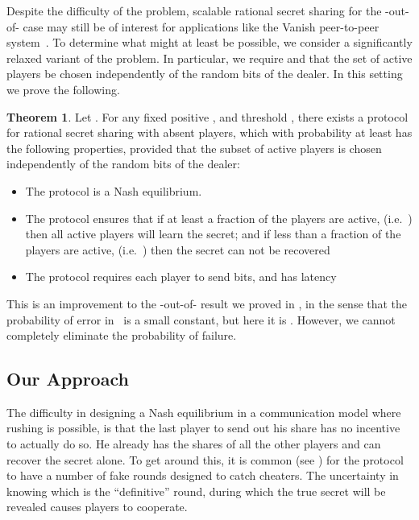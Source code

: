 \documentclass[12pt]{article}
\theoremstyle{definition}
\newtheorem{theorem}{Theorem}
\begin{document}
Despite the difficulty of the problem, scalable rational secret
sharing for the -out-of- case may still be of interest for
applications like the Vanish peer-to-peer
system~\cite{geambasu2009vanish}.  To determine what might at least be
possible, we consider a significantly relaxed variant of the problem.
In particular, we require  and that the set of 
active players be chosen independently of the random bits of the
dealer.  In this setting we prove the following.

\begin{theorem}
Let .  For any fixed positive , and threshold
, there exists a protocol for rational secret sharing with
absent players, which with probability at least  has
the following properties, provided that the subset of  active
players is chosen independently of the random bits of the dealer:
\begin{itemize}
\item The protocol is a Nash equilibrium.
\item The protocol ensures that if at least a 
  fraction of the players are active, (i.e. \,) then all active players will learn the secret; and if
  less than a  fraction of the players are active,
  (i.e. \,) then the secret can not be
  recovered
\item The protocol requires each player to send  bits,
  and has latency 
\end{itemize}
\label{thm:mofn}
\end{theorem}

This is an improvement to the -out-of- result we proved
in \cite{RSSpodc11}, in the sense that the probability of error
in~\cite{RSSpodc11} is a small constant, but here it is .
However, we cannot completely eliminate the probability of failure.

\subsection{Our Approach}

The difficulty in designing a Nash equilibrium in a communication
model where rushing is possible, is that the last player to send out
his share has no incentive to actually do so.  He already has the
shares of all the other players and can recover the secret alone. To
get around this, it is common (see \cite{halpern2004rational,
  abraham2006distributed, gordon2006rational,
  lysyanskaya2006rationality, kol2008games}) for the protocol to have
a number of fake rounds designed to catch cheaters. The uncertainty in
knowing which is the ``definitive'' round, during which the true
secret will be revealed causes players to cooperate.
\end{document}

